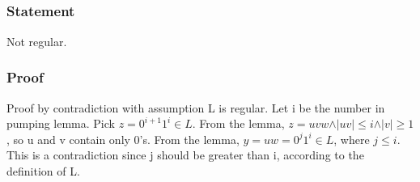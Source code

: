 \documentclass{article}
\begin{document}
\subsection{}
\subsubsection{Statement}
Not regular.
\subsubsection{Proof}
Proof by contradiction with assumption L is regular. Let i be the number in
pumping lemma. Pick $z = 0^{i+1}1^i \in L$. From the lemma, $z = uvw \land \vert
uv \vert \leq i \land \vert v \vert \geq 1$, so u and v contain only 0's. From
the lemma, $y = uw = 0^j1^i \in L$, where $j \leq i$. This is a contradiction
since j should be greater than i, according to the definition of L.
\end{document}
